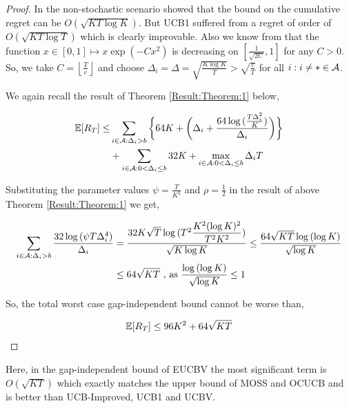 \begin{proof}
\label{Proof:Corollary:1}
In the non-stochastic scenario \cite{auer2002nonstochastic} showed that the bound on the cumulative regret can be $O\left(\sqrt{KT\log K}\right)$. But UCB1 suffered from a regret of order of  $O\left(\sqrt{KT\log T}\right)$  which is clearly improvable. Also we know from \citet{bubeck2011pure} that the function $x\in [0,1]\mapsto x\exp(-Cx^2)$ is  decreasing on $\left[\frac{1}{\sqrt{2C}},1\right ]$ for any $C>0$. So, we take $C=\left\lfloor \frac{T}{e}\right\rfloor$ and choose  $\Delta_{i}=\Delta=\sqrt{\frac{K\log K}{T}}>\sqrt{\frac{e}{T}}$ for all ${i:i\neq *}\in \mathcal{A} $.

	We again recall the result of Theorem \ref{Result:Theorem:1} below, 
	
\begin{align*}
\mathbb{E} [R_{T}] \leq &\sum\limits_{i\in \mathcal{A} :\Delta_{i} > b}\bigg\lbrace 64 K + \bigg(\Delta_{i}+\dfrac{64\log{(\frac{T\Delta_{i}^{2}}{K})}}{\Delta_{i}}\bigg)\bigg \rbrace\\ 
  & +\sum\limits_{i\in \mathcal{A} :0 < \Delta_{i}\leq b} 32 K + \max_{i\in \mathcal{A} :0 < \Delta_{i}\leq b}\Delta_{i}T  
\end{align*}


Substituting the parameter values $\psi=\frac{T}{K^2}$ and $\rho=\frac{1}{2}$ in the result of above Theorem \ref{Result:Theorem:1} we get,
	
	\begin{align*}
	\sum_{i\in \mathcal{A} :\Delta_{i} > b}\dfrac{32\log{(\psi T\Delta_{i}^{4})}}{\Delta_{i}} &= \dfrac{32K\sqrt{T}\log{(T^{2}\dfrac{K^{2}(\log K)^{2}}{T^{2} K^2})}}{\sqrt{K\log K}} \leq  \dfrac{64\sqrt{KT}\log{(\log K)}}{\sqrt{\log K}}\\
	&\leq 64\sqrt{KT} \text{ ,   as $\dfrac{\log{(\log K)}}{\sqrt{\log K}}\leq 1$}
	\end{align*}		
	
 	
	So, the total worst case gap-independent bound cannot be worse than,
	
	\begin{align*}
	\mathbb{E}[R_{T}]\leq 96 K^2 + 64\sqrt{KT}
	\end{align*}		
\end{proof}


Here, in the gap-independent bound of EUCBV the most significant term is $O\left(\sqrt{KT}\right)$ which exactly matches the upper bound of MOSS and OCUCB and is better than UCB-Improved, UCB1 and UCBV.
